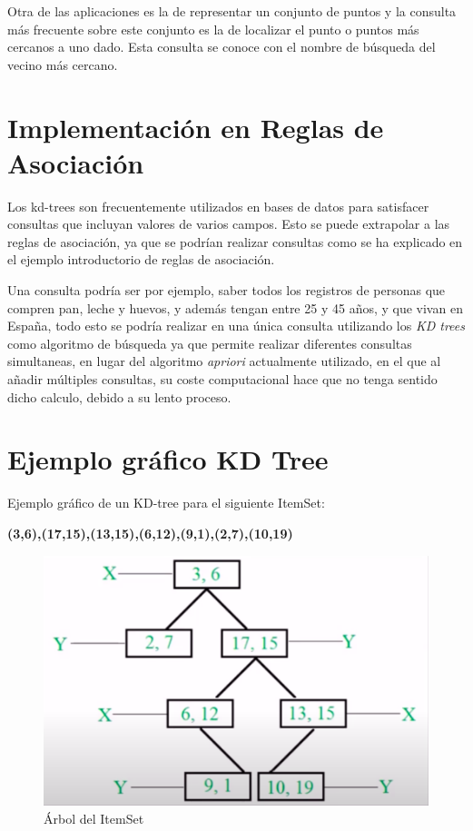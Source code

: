 \documentclass{cosas/tfg_domingo}
\begin{document}
Otra de las aplicaciones es la de representar un conjunto de puntos y la consulta más frecuente sobre este conjunto es la de localizar el punto o puntos más cercanos a uno dado. Esta consulta se conoce con el nombre de búsqueda del vecino más cercano.

\section{Implementación en Reglas de Asociación}

Los kd-trees son frecuentemente utilizados en bases de datos para satisfacer consultas que incluyan valores de varios campos. Esto se puede extrapolar a las reglas de asociación, ya que se podrían realizar consultas como se ha explicado en el ejemplo introductorio de reglas de asociación.

\hspace{0.5mm}

Una consulta podría ser por ejemplo, saber todos los registros de personas que compren pan, leche y huevos, y además tengan entre 25 y 45 años, y que vivan en España, todo esto se podría realizar en una única consulta utilizando los \textit{KD trees} como algoritmo de búsqueda ya que permite realizar diferentes consultas simultaneas, en lugar del algoritmo \textit{apriori} actualmente utilizado, en el que al añadir múltiples consultas, su coste computacional hace que no tenga sentido dicho calculo, debido a su lento proceso.

\newpage
\section{Ejemplo gráfico KD Tree}

\hfill

Ejemplo gráfico de un KD-tree para el siguiente ItemSet:

\textbf{{(3,6),(17,15),(13,15),(6,12),(9,1),(2,7),(10,19)}}

\hfill

\begin{figure}[h]
\begin{center}
\includegraphics[width=.4\linewidth]{imagenes/kdtree1.png}
\end{center}
\caption{Árbol del ItemSet}
\label{arbol_kd}
\end{figure}
\end{document}
